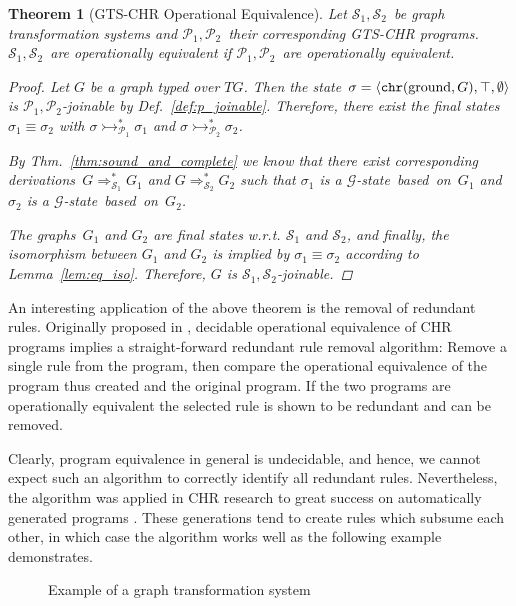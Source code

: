 \documentclass{tlp}
\newtheorem{theorem}{Theorem}\newtheorem{corollary}[theorem]{Corollary}
\newcommand{\st}[3]{\ensuremath{\langle #1 , #2 , #3 \rangle}}
\newcommand{\mcG}{\ensuremath{\mathcal{G}}}
\newcommand{\mcP}{\ensuremath{\mathcal{P}}}
\newcommand{\mcS}{\ensuremath{\mathcal{S}}}
\newcommand{\Ps}{\ensuremath{\mcP_1,\mcP_2}}
\newcommand{\Ss}{\ensuremath{\mcS_1,\mcS_2}}
\newcommand{\der}{\ensuremath{\rightarrowtail}}
\newcommand{\dergts}{\ensuremath{\Rightarrow}}
\DeclareMathOperator{\gnd}{ground}
\newcommand{\chr}{\ensuremath{{\tt chr}}}
\begin{document}
\begin{theorem}[GTS-CHR Operational Equivalence]\label{thm:gtsopeq}
Let \Ss\ be graph transformation systems and \Ps\ their corresponding GTS-CHR
programs. \Ss\ are operationally equivalent if \Ps\ are operationally
equivalent.

\begin{proof}

Let $G$ be a graph typed over $TG$. Then the state~$\sigma = \st{\chr(\gnd,
G)}{\top}{\emptyset}$ is \Ps-joinable by Def.~\ref{def:p_joinable}. Therefore,
there exist the final states~$\sigma_1 \equiv \sigma_2$ with $\sigma
\der_{\mcP_1}^* \sigma_1$ and $\sigma \der_{\mcP_2}^* \sigma_2$.

By Thm.~\ref{thm:sound_and_complete} we know that there exist corresponding
derivations~$G \dergts_{\mcS_1}^* G_1$ and $G \dergts_{\mcS_2}^* G_2$ such
that $\sigma_1$ is a \mcG-state~based~on~$G_1$ and $\sigma_2$ is a
\mcG-state~based~on~$G_2$.

The graphs~$G_1$ and $G_2$ are final states w.r.t. $\mcS_1$ and $\mcS_2$, and
finally, the isomorphism between $G_1$ and $G_2$ is implied by $\sigma_1 \equiv
\sigma_2$ according to Lemma~\ref{lem:eq_iso}. Therefore, $G$ is \Ss-joinable.
\end{proof}
\end{theorem}

An interesting application of the above theorem is the removal of redundant
rules. Originally proposed in \cite{Abdennadher2003}, decidable operational
equivalence of CHR programs implies a straight-forward redundant rule removal
algorithm: Remove a single rule from the program, then compare the operational
equivalence of the program thus created and the original program. If the two
programs are operationally equivalent the selected rule is shown to be redundant
and can be removed.

Clearly, program equivalence in general is undecidable, and hence, we cannot
expect such an algorithm to correctly identify all redundant rules. Nevertheless,
the algorithm was applied in CHR research to great success on automatically
generated programs \cite{Abdennadher2007,raiser08cp}. These generations tend to
create rules which subsume each other, in which case the algorithm works well as
the following example demonstrates.

\begin{figure}
\centerline{
}
\caption{Example of a graph transformation system}
\label{fig:ex:opeq}
\end{figure}
\end{document}

